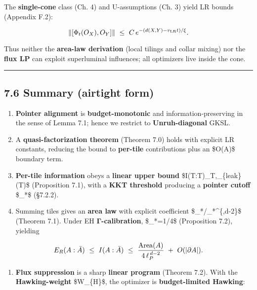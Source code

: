 \documentclass[
]{article}
\providecommand{\tightlist}{%
  \setlength{\itemsep}{0pt}\setlength{\parskip}{0pt}}
\numberwithin{equation}{section}
\begin{document}
The \textbf{single-cone} class (Ch. 4) and U-assumptions (Ch. 3) yield
LR bounds (Appendix F.2):

\[
\|[\Phi_t(O_X),O_Y]\|\ \le\ C\,e^{-(d(X,Y)-v_{\rm LR}t)/\xi}.
\]

Thus neither the \textbf{area-law derivation} (local tilings and collar
mixing) nor the \textbf{flux LP} can exploit superluminal influences;
all optimizers live inside the cone.

\begin{center}\rule{0.5\linewidth}{0.5pt}\end{center}

\hypertarget{summary-airtight-form}{%
\subsection{7.6 Summary (airtight form)}\label{summary-airtight-form}}

\begin{enumerate}
\def\labelenumi{\arabic{enumi}.}
\tightlist
\item
  \textbf{Pointer alignment} is \textbf{budget-monotonic} and
  information-preserving in the sense of Lemma 7.1; hence we restrict to
  \textbf{Unruh-diagonal} GKSL.
\item
  A \textbf{quasi-factorization theorem} (Theorem 7.0) holds with
  explicit LR constants, reducing the bound to \textbf{per-tile}
  contributions plus an \$O(\textbar{}\partial A\textbar)\$ boundary
  term.
\item
  \textbf{Per-tile information} obeys a \textbf{linear upper bound}
  \$I(T:\overline T)\le \chi\_T,\tau\_\{\rm leak\}(T)\$ (Proposition
  7.1), with a \textbf{KKT threshold} producing a \textbf{pointer
  cutoff} \$\ell\_*\$ (§7.2.2).
\item
  Summing tiles gives an \textbf{area law} with explicit coefficient
  \$\chi\_*/\ell\_*\^{}\{,d-2\}\$ (Theorem 7.1). Under EH
  \textbf{Γ-calibration}, \$\chi\_*=1/4\$ (Proposition 7.2), yielding
\end{enumerate}

\[
E_R(A:\bar A)\ \le\ I(A:\bar A)\ \le\ \frac{{\rm Area}(A)}{4\,\ell_P^{\,d-2}}\ +\ O(|\partial A|).
\]

\begin{enumerate}
\def\labelenumi{\arabic{enumi}.}
\setcounter{enumi}{4}
\tightlist
\item
  \textbf{Flux suppression} is a sharp \textbf{linear program} (Theorem
  7.2). With the \textbf{Hawking-weight} \$W\_\{\rm H\}\$, the optimizer
  is \textbf{budget-limited Hawking}:
\end{enumerate}
\end{document}
